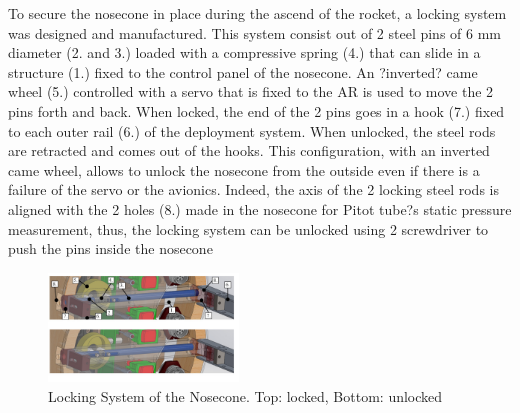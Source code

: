 To secure the nosecone in place during the ascend of the rocket, a locking system was designed and manufactured. This system consist out of 2 steel pins of 6 mm diameter (2. and 3.) loaded with a compressive spring (4.) that can slide in a structure (1.) fixed to the control panel of the nosecone. An ?inverted? came wheel (5.) controlled with a servo that is fixed to the AR is used to move the 2 pins forth and back. When locked, the end of the 2 pins goes in a hook (7.) fixed to each outer rail (6.) of the
deployment system. When unlocked, the steel rods are retracted and comes out of the hooks. 
This configuration, with an inverted came wheel, allows to unlock the nosecone from the outside even if there is a failure of the servo or the avionics. Indeed, the axis of the 2 locking steel rods is aligned with the 2 holes (8.) made in the nosecone for Pitot tube?s static pressure measurement, thus, the locking system can be unlocked using 2 screwdriver to push the pins inside the nosecone

  \begin{figure}[h!]
 	\centering
        \includegraphics[width=0.45\textwidth]{img/AV_FIG_CAD_lockingsystem_22.jpg}
        \caption{Locking System of the Nosecone. Top: locked, Bottom: unlocked}
        \label{f:av_locking_sys}
 \end{figure}

